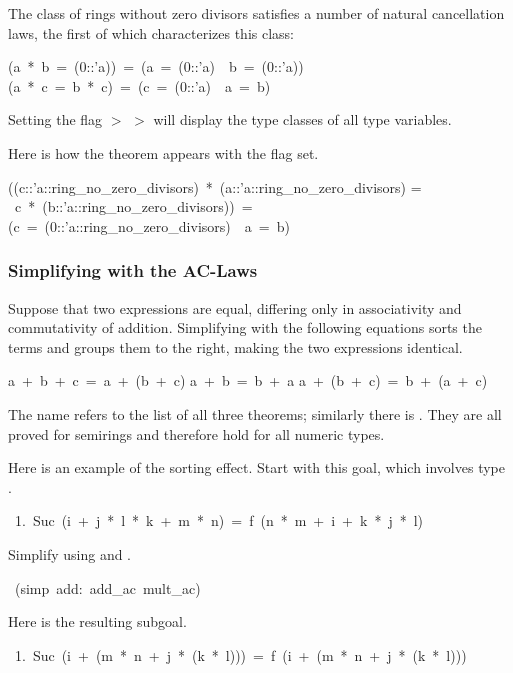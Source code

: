 The class  of rings without zero divisors satisfies a number of natural cancellation laws, the first of which characterizes this class:
\begin{isabelle}
(a\ *\ b\ =\ (0::'a))\ =\ (a\ =\ (0::'a)\ \isasymor \ b\ =\ (0::'a))
\isanewline
(a\ *\ c\ =\ b\ *\ c)\ =\ (c\ =\ (0::'a)\ \isasymor \ a\ =\ b)
\end{isabelle}
\begin{pgnote}
Setting the flag  $>$  $>$
 will display the type classes of all type variables.
\end{pgnote}
\noindent
Here is how the theorem  appears with the flag set.
\begin{isabelle}
((c::'a::ring_no_zero_divisors)\ *\ (a::'a::ring_no_zero_divisors) =\isanewline
\ c\ *\ (b::'a::ring_no_zero_divisors))\ =\isanewline
(c\ =\ (0::'a::ring_no_zero_divisors)\ \isasymor\ a\ =\ b)
\end{isabelle}


\subsubsection{Simplifying with the AC-Laws}
Suppose that two expressions are equal, differing only in 
associativity and commutativity of addition.  Simplifying with the
following equations sorts the terms and groups them to the right, making
the two expressions identical.
\begin{isabelle}
a\ +\ b\ +\ c\ =\ a\ +\ (b\ +\ c)
\isanewline
a\ +\ b\ =\ b\ +\ a%
\isanewline
a\ +\ (b\ +\ c)\ =\ b\ +\ (a\ +\ c)
\end{isabelle}
The name  
refers to the list of all three theorems; similarly
there is . 
They are all proved for semirings and therefore hold for all numeric types.

Here is an example of the sorting effect.  Start
with this goal, which involves type .
\begin{isabelle}
\ 1.\ Suc\ (i\ +\ j\ *\ l\ *\ k\ +\ m\ *\ n)\ =\
f\ (n\ *\ m\ +\ i\ +\ k\ *\ j\ *\ l)
\end{isabelle}
%
Simplify using   and .
\begin{isabelle}
\ (simp\ add:\ add_ac\ mult_ac)
\end{isabelle}
%
Here is the resulting subgoal.
\begin{isabelle}
\ 1.\ Suc\ (i\ +\ (m\ *\ n\ +\ j\ *\ (k\ *\ l)))\
=\ f\ (i\ +\ (m\ *\ n\ +\ j\ *\ (k\ *\ l)))%
\end{isabelle}


